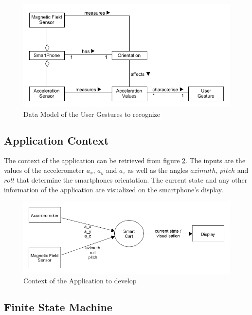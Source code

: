 \begin{figure}
\centering
\captionsetup{justification=centering}
\includegraphics[width=\textwidth]{res/sa/UserGestureDataModel.png}
\caption{Data Model of the User Gestures to recognize}
\label{fig:DataModel}
\end{figure}

\subsection{Application Context}
The context of the application can be retrieved from figure \ref{fig:context}.
The inputs are the values of the accelerometer $a_x$, $a_y$ and $a_z$ as well as
the angles $azimuth$, $pitch$ and $roll$ that determine the smartphones
orientation. The current state and any other information of the application are
visualized on the smartphone's display.

\begin{figure}
\centering
\captionsetup{justification=centering}
\includegraphics[width=\textwidth]{res/sa/ContextDiagram.png}
\caption{Context of the Application to develop}
\label{fig:context}
\end{figure}

\subsection{Finite State Machine}

